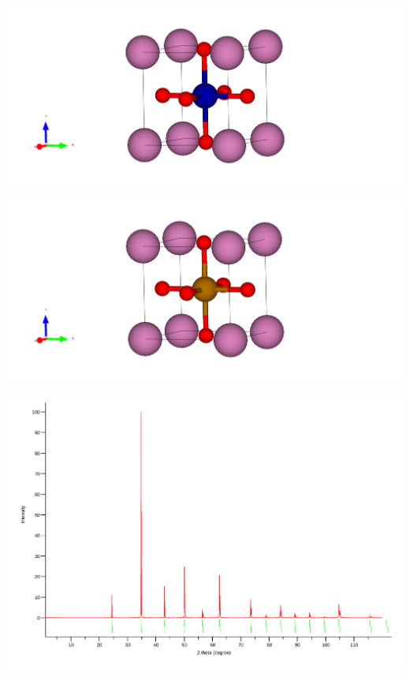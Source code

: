 \documentclass[12pt, letterpaper]{article}
\newcommand*{\1}{\hspace{1pt}}
\begin{document}
    \begin{adjustbox}{center,caption={Cubic Structure of InCoO3},label={somelabel},nofloat=figure,vspace=\bigskipamount}
        \includegraphics[width=\textwidth]{InCoO3}
    \end{adjustbox}

    \begin{adjustbox}{center,caption={Cubic Structure of InFeO3},label={somelabel},nofloat=figure,vspace=\bigskipamount}
        \includegraphics[width=\textwidth]{InFeO3}
    \end{adjustbox}

    \begin{adjustbox}{center,caption={X-Ray diffraction pattern of InCoO3},label={somelabel},nofloat=figure,vspace=\bigskipamount}
        \includegraphics[width=\textwidth]{POSCARCo}
    \end{adjustbox}
    
\end{document}
